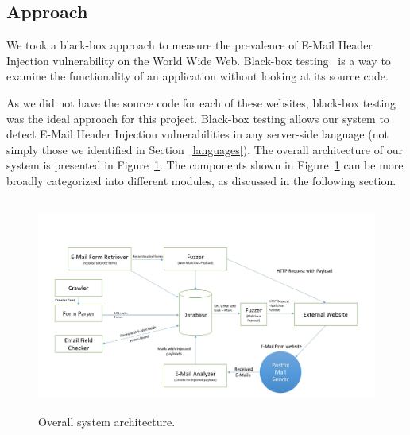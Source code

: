 \subsection{Approach}
\label{sys:appr}
We took a black-box approach to measure the prevalence of E-Mail Header Injection vulnerability on the World Wide Web. Black-box testing~\cite{wiki:Black-box_testing} is a way to examine the functionality of an application without looking at its source code.

As we did not have the source code for each of these websites, black-box testing was the ideal approach for this project. Black-box testing allows our system to detect E-Mail Header Injection vulnerabilities in any server-side language (not simply those we identified in Section~\ref{languages}). The overall architecture of our system is presented in Figure~\ref{fig:overall}. The components shown in Figure~\ref{fig:overall} can be more broadly categorized into different modules, as discussed in the following section.

\begin{figure}
	\centering
	\includegraphics[width=14cm, height=7cm]{overall}
	\caption{Overall system architecture.}
	\label{fig:overall}
\end{figure}
